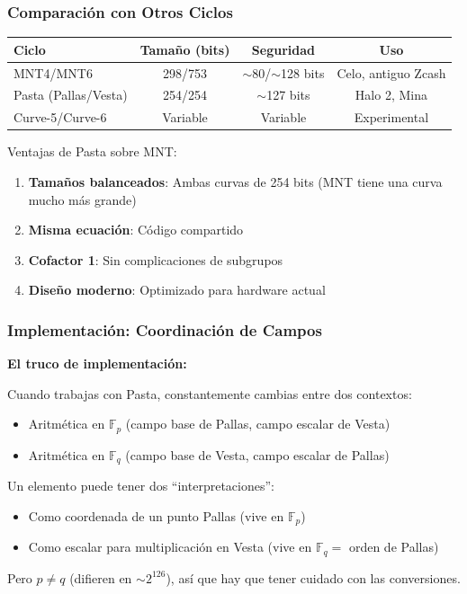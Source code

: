 \documentclass[11pt,a4paper,twoside,openright]{book}
\theoremstyle{definition}
\theoremstyle{plain}
\theoremstyle{remark}
\begin{document}
\subsubsection{Comparación con Otros Ciclos}

\begin{center}
\begin{tabular}{lccc}
\toprule
\textbf{Ciclo} & \textbf{Tamaño (bits)} & \textbf{Seguridad} & \textbf{Uso} \\
\midrule
MNT4/MNT6 & 298/753 & $\sim$80/$\sim$128 bits & Celo, antiguo Zcash \\
Pasta (Pallas/Vesta) & 254/254 & $\sim$127 bits & Halo 2, Mina \\
Curve-5/Curve-6 & Variable & Variable & Experimental \\
\bottomrule
\end{tabular}
\end{center}

\begin{keyidea}
Ventajas de Pasta sobre MNT:
\begin{enumerate}
    \item \textbf{Tamaños balanceados}: Ambas curvas de 254 bits (MNT tiene una curva mucho más grande)
    \item \textbf{Misma ecuación}: Código compartido
    \item \textbf{Cofactor 1}: Sin complicaciones de subgrupos
    \item \textbf{Diseño moderno}: Optimizado para hardware actual
\end{enumerate}
\end{keyidea}

\subsubsection{Implementación: Coordinación de Campos}

\begin{mathnote}
\textbf{El truco de implementación:}

Cuando trabajas con Pasta, constantemente cambias entre dos contextos:
\begin{itemize}
    \item Aritmética en $\mathbb{F}_p$ (campo base de Pallas, campo escalar de Vesta)
    \item Aritmética en $\mathbb{F}_q$ (campo base de Vesta, campo escalar de Pallas)
\end{itemize}

Un elemento puede tener dos ``interpretaciones'':
\begin{itemize}
    \item Como coordenada de un punto Pallas (vive en $\mathbb{F}_p$)
    \item Como escalar para multiplicación en Vesta (vive en $\mathbb{F}_q = $ orden de Pallas)
\end{itemize}

Pero $p \neq q$ (difieren en $\sim 2^{126}$), así que hay que tener cuidado con las conversiones.
\end{mathnote}
\end{document}
